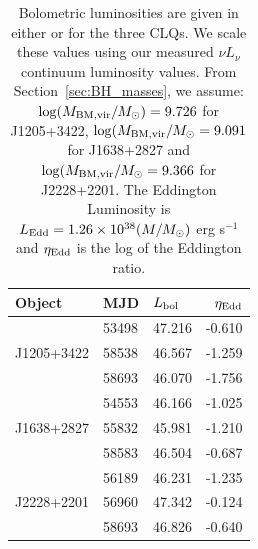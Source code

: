 \documentclass[fleqn,usenatbib]{mnras}
\begin{document}
\begin{table}
  \centering
  \begin{tabular}{l l l r}
    \hline
    \hline
    Object           & MJD      & $L_{\rm bol}$    &  $\eta_{\rm Edd}$  \\
    \hline
                         & 53498    & 47.216           &  -0.610                  \\
    J1205+3422 & 58538    &  46.567          &  -1.259  \\                        %
                         & 58693     &  46.070         &  -1.756 \\
    \hline 
                          & 54553   & 46.166    & -1.025 \\
    J1638+2827  & 55832   & 45.981    & -1.210  \\                                            %
                          & 58583   & 46.504   & -0.687       \\
    \hline 
                          & 56189   & 46.231   &  -1.235 \\
    J2228+2201   & 56960    & 47.342   & -0.124 \\                                             %
                          & 58693   & 46.826     &  -0.640 \\
    \hline
    \hline
  \end{tabular}
  \caption{
    Bolometric luminosities are given in either \citet{Shen2011} or 
    \citet{Kozlowski2017} for the three CLQs. We scale these 
    values using our measured $\nu L_{\nu}$ continuum luminosity values.
    From Section~\ref{sec:BH_masses}, we assume: $\log(M_{\rm BM, vir}/M_{\odot}) = 9.726$ for J1205+3422,
    $\log(M_{\rm BM, vir}/M_{\odot} = 9.091$ for  J1638+2827 
    and $\log(M_{\rm BM, vir}/M_{\odot} = 9.366$ for J2228+2201. 
    The Eddington Luminosity is 
    $L_{\rm Edd} = 1.26\times10^{38} (M/M_{\odot})$ erg s$^{-1}$ and
   $\eta_{\rm Edd}$ is the log of the Eddington ratio.}
\label{tab:Eddington_ratios} 
\end{table}
\end{document}
